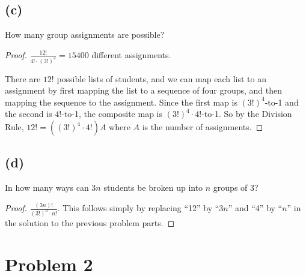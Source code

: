 \documentclass[14pt]{extarticle}
\newcommand{\dps}{\displaystyle}
\begin{document}
\subsection{(c)}
How many group assignments are possible?
\begin{proof}
$\dps\frac{12!}{4!\cdot (3!)^4} = 15400$ different assignments.

There are $12!$ possible lists of students, and we can map each list to an assignment by first mapping the list to a sequence of four groups, and then mapping the sequence to the assignment. Since the first map is $(3!)^4$-to-1 and the second is $4!$-to-1, the composite map is $(3!)^4\cdot 4!$-to-1. So by the Division Rule, $12! = ((3!)^4 \cdot 4!) A$ where $A$ is the number of assignments.
\end{proof}

\subsection{(d)}
In how many ways can $3n$ students be broken up into $n$ groups of 3?
\begin{proof}
$\dps\frac{(3n)!}{(3!)^n \cdot n!}$. This follows simply by replacing “12” by “$3n$” and “4” by “$n$” in the solution to the previous problem parts.
\end{proof}

\section{Problem 2}
\end{document}
